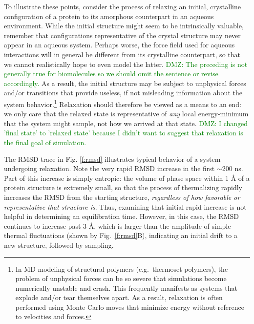 To illustrate these points, consider the process of relaxing an initial, crystalline configuration of a protein to its amorphous counterpart in an aqueous environment.  While the initial structure might seem to be intrinsically valuable, remember that configurations representative of the crystal structure may never appear in an aqueous system.  Perhaps worse, the force field used for aqueous interactions will in general be different from its crystalline counterpart, so that we cannot realistically hope to even model the latter.  \textcolor{green}{DMZ: The preceding is not generally true for biomolecules so we should omit the sentence or revise accordingly.}  As a result, the initial structure may be subject to unphysical forces and/or transitions that provide useless, if not misleading information about the system behavior.\footnote{In MD modeling of structural polymers (e.g.\ thermoset polymers), the problem of unphysical forces can be so severe that simulations become numerically unstable and crash.  This frequently manifests as systems that explode and/or tear themselves apart.  As a result, relaxation is often performed using Monte Carlo moves that minimize energy without reference to velocities and forces.}  Relaxation should therefore be viewed as a means to an end: we only care that the relaxed state is representative of {\it any} local energy-minimum that the system might sample, not how we arrived at that state. \textcolor{green}{DMZ: I changed 'final state' to 'relaxed state' because I didn't want to suggest that relaxation is the final goal of simulation.}

The RMSD trace in Fig. \ref{f:rmsd} illustrates typical behavior of a system undergoing relaxation.  Note the very rapid RMSD increase in the first $\sim$200 ns. Part of this increase is simply entropic: the volume of phase space within 1 {\AA} of a protein structure is extremely small, so that the process of thermalizing rapidly increases the RMSD from the starting structure, \emph{regardless of how favorable or representative that structure is}.  Thus, examining that initial rapid increase is not helpful in determining an equilibration time.  However, in this case, the RMSD continues to increase past 3 {\AA}, which is larger than the amplitude of simple thermal fluctuations (shown by Fig.\ \ref{f:rmsd}B), indicating an initial drift to a new structure, followed by sampling.


